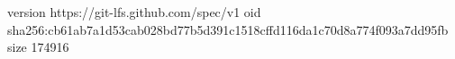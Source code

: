 version https://git-lfs.github.com/spec/v1
oid sha256:cb61ab7a1d53cab028bd77b5d391c1518cffd116da1c70d8a774f093a7dd95fb
size 174916
